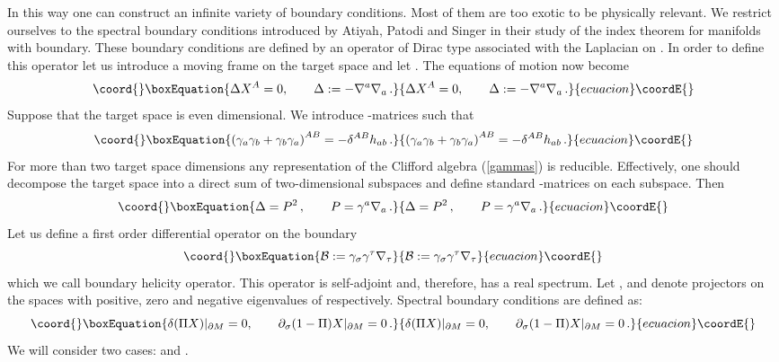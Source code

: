 \documentclass[a4paper,12pt,twoside]{article}
\begin{document}
In this way one can construct an infinite variety of boundary
conditions. Most of them are too exotic to be physically
relevant. We restrict ourselves to the spectral boundary
conditions introduced by Atiyah, Patodi and Singer \cite{Atiyah:1980jh}
in their study of the index theorem for manifolds with boundary.
These boundary conditions are defined by an operator of Dirac
type associated with the Laplacian on \coordHE{}. In order to define this operator
let us introduce a moving frame \coordHE{} on the target space
and let \coordHE{}. The equations of motion now become
\begin{equation}\coord{}\boxEquation{
\Delta X^A=0,\qquad \Delta :=-\nabla^a\nabla_a \,.
\label{eom}
}{
\Delta X^A=0,\qquad \Delta :=-\nabla^a\nabla_a \,.
}{ecuacion}\coordE{}\end{equation}
Suppose that the target space is even dimensional. We introduce
\myHighlight{$\gamma$}\coordHE{}-matrices such that 
\begin{equation}\coord{}\boxEquation{
\left(\gamma_a\gamma_b +\gamma_b\gamma_a\right)^{AB}=-\delta^{AB}h_{ab}
\,. \label{gammas}
}{
\left(\gamma_a\gamma_b +\gamma_b\gamma_a\right)^{AB}=-\delta^{AB}h_{ab}
\,. }{ecuacion}\coordE{}\end{equation}
For more than two target space dimensions any representation of
the Clifford algebra (\ref{gammas}) is reducible. Effectively,
one should decompose the target space into a direct sum of 
two-dimensional subspaces and define standard \myHighlight{$\gamma$}\coordHE{}-matrices
on each subspace. Then
\begin{equation}\coord{}\boxEquation{
\Delta =P^2\,,\qquad P=\gamma^a\nabla_a \,. 
\label{DP}
}{
\Delta =P^2\,,\qquad P=\gamma^a\nabla_a \,. 
}{ecuacion}\coordE{}\end{equation}
Let us define a first order differential operator on 
the boundary \coordHE{}
\begin{equation}\coord{}\boxEquation{
{\cal B}:=\gamma_\sigma \gamma^\tau \nabla_\tau \label{helop}
}{
{\cal B}:=\gamma_\sigma \gamma^\tau \nabla_\tau }{ecuacion}\coordE{}\end{equation}
which we call boundary helicity operator. This operator is
self-adjoint and, therefore, has a real spectrum. Let 
\myHighlight{$\Pi_+$}\coordHE{}, \coordHE{} and \myHighlight{$\Pi_-$}\coordHE{} denote projectors on the
spaces with positive, zero and negative eigenvalues of
\coordHE{} respectively. Spectral boundary conditions
are defined as:
\begin{equation}\coord{}\boxEquation{
\delta (\Pi X)|_{\partial M}=0,\qquad 
\partial_\sigma (1-\Pi )X |_{\partial M}=0 \,.\label{isbc}
}{
\delta (\Pi X)|_{\partial M}=0,\qquad 
\partial_\sigma (1-\Pi )X |_{\partial M}=0 \,.}{ecuacion}\coordE{}\end{equation}
We will consider two cases: \myHighlight{$\Pi =\Pi_+$}\coordHE{} and \coordHE{}.
\end{document}
